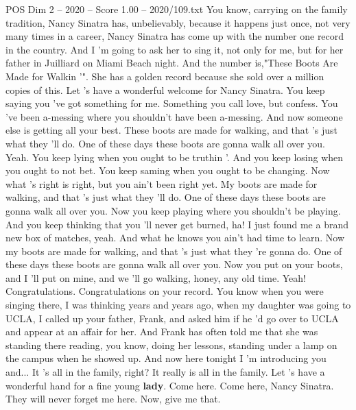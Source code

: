 \begin{textsample}{POS Dim 2 – 2020 – Score 1.00 – 2020/109.txt}  \label{ex:f2_pos_030}
You know, carrying on the family tradition, Nancy Sinatra has, unbelievably, because it happens just once, not very many times in a career, Nancy Sinatra has come up with the number one record in the country.
And I 'm going to ask her to sing it, not only for me, but for her father in Juilliard on Miami Beach night.
And the number is,"These Boots Are Made for Walkin '".
She has a golden record because she sold over a million copies of this.
Let 's have a wonderful welcome for Nancy Sinatra.
You keep saying you 've got something for me.
Something you call love, but confess.
You 've been a-messing where you shouldn't have been a-messing.
And now someone else is getting all your best.
These boots are made for walking, and that 's just what they 'll do.
One of these days these boots are gonna walk all over you.
Yeah.
You keep lying when you ought to be truthin '.
And you keep losing when you ought to not bet.
You keep saming when you ought to be changing.
Now what 's right is right, but you ain't been right yet.
My boots are made for walking, and that 's just what they 'll do.
One of these days these boots are gonna walk all over you.
Now you keep playing where you shouldn't be playing.
And you keep thinking that you 'll never get burned, ha!
I just found me a brand new box of matches, yeah.
And what he knows you ain't had time to learn.
Now my boots are made for walking, and that 's just what they 're gonna do.
One of these days these boots are gonna walk all over you.
Now you put on your boots, and I 'll put on mine, and we 'll go walking, honey, any old time.
Yeah!
Congratulations.
Congratulations on your record.
You know when you were singing there, I was thinking years and years ago, when my daughter was going to UCLA, I called up your father, Frank, and asked him if he 'd go over to UCLA and appear at an affair for her.
And Frank has often told me that she was standing there reading, you know, doing her lessons, standing under a lamp on the campus when he showed up.
And now here tonight I 'm introducing you and...
It 's all in the family, right?
It really is all in the family.
Let 's have a wonderful hand for a fine young \textbf{lady}.
Come here.
Come here, Nancy Sinatra.
They will never forget me here.
Now, give me that.

\end{textsample}
